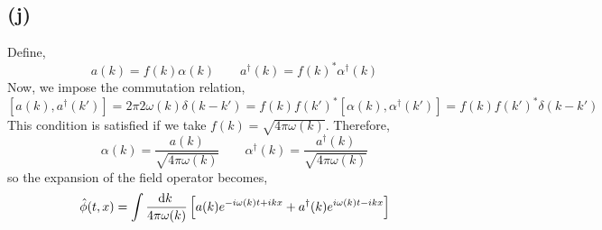 \documentclass[12pt]{extarticle}
\begin{document}
\subsection*{(j)}

Define,
\[ a(k) = f(k) \alpha(k) \quad \quad a^\dagger(k) = f(k)^{*} \alpha^\dagger(k)\]
Now, we impose the commutation relation,
\[ [a(k), a^\dagger(k')] = 2 \pi 2 \omega(k) \delta(k - k') = f(k) f(k')^{*} [\alpha(k), \alpha^\dagger(k')] = f(k) f(k')^{*} \delta(k - k') \]
This condition is satisfied if we take $f(k) = \sqrt{4 \pi \omega(k)}$. Therefore, 
\[ \alpha(k) = \frac{a(k)}{\sqrt{4 \pi \omega(k)}} \quad \quad \alpha^\dagger(k) = \frac{a^\dagger(k)}{\sqrt{4 \pi \omega(k)}} \]
so the expansion of the field operator becomes,
\[ \hat{\phi}(t, x) = \int \frac{\mathrm{d}k \:}{4 \pi \omega(k)} \left[ a(k) e^{- i \omega(k) t + i k x} + a^\dagger(k) e^{i \omega(k) t - i k x} \right] \]
\end{document}
